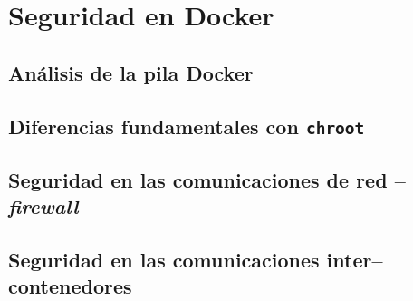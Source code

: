 \documentclass[a4paper,oneside,12pt]{article}
\begin{document}
\section{Seguridad en Docker}
\subsection{Análisis de la pila Docker}
\subsection{Diferencias fundamentales con \texttt{chroot}}
\subsection{Seguridad en las comunicaciones de red -- \textit{firewall}}
\subsection{Seguridad en las comunicaciones inter--contenedores}

\printbibliography[heading=bibintoc]

\appendix
\end{document}

